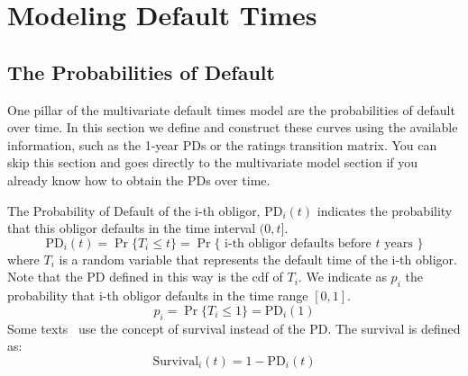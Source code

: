 \documentclass[11pt,fleqn]{book} %
\begin{document}


\chapter{Modeling Default Times}
\label{chap:mdt}

\section{The Probabilities of Default}

One pillar of the multivariate default times model are the probabilities 
of default over time. In this section we define and construct these curves 
using the available information, such as the 1-year PDs or the ratings 
transition matrix. You can skip this section and goes directly to the 
multivariate model section if you already know how to obtain the PDs over 
time.

\begin{definition}
	The Probability of Default of the i-th obligor, $\text{PD}_i(t)$
	indicates the probability that this obligor defaults in the time 
	interval $(0,t]$.
	\begin{displaymath}
		\text{PD}_i(t) = \Pr\{T_i \le t\} = 
		\Pr\{\text{ i-th obligor defaults before $t$ years }\}
	\end{displaymath}
	where $T_i$ is a random variable that represents the default
	time of the i-th obligor. Note that the PD defined in this way 
	is the cdf of $T_i$. We indicate as $p_i$ the probability that 
	i-th obligor defaults in the time range $[0,1]$.
	\begin{displaymath}
		p_i = \Pr\{T_i \le 1\} = \text{PD}_i(1) 
	\end{displaymath}
	Some texts~\cite{li:2000,roncalli:2001} use the concept of 
	survival instead of the PD\@. The survival is defined as:
	\begin{displaymath}
		\text{Survival}_i(t) = 1-\text{PD}_i(t)
	\end{displaymath}
\end{definition}
\end{document}
